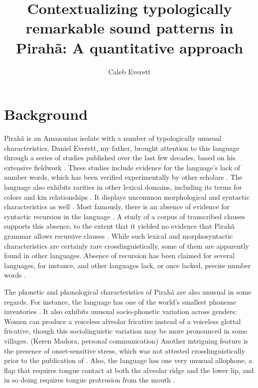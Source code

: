 \documentclass[output=paper,colorlinks,citecolor=brown
]{langscibook}
\title[Contextualizing typologically remarkable sound patterns in Pirahã]{Contextualizing typologically remarkable sound patterns in Pirahã: A quantitative approach}
\author{Caleb Everett}
\begin{document}
\label{chap-13_everett}

\maketitle

\section{Background}

Pirahã is an Amazonian isolate with a number of typologically unusual characteristics. Daniel
Everett, my father, brought attention to this language through a series of studies published over
the last few decades, based on his extensive fieldwork \citep{everett1982phonetic,
  everett1984relevance,everett1986piraha,everett2001monolingual}. These studies include evidence for
the language's lack of number words, which has been verified experimentally by other scholars
\citep{frank2008number, everett2012quantity}. The language also exhibits rarities in other lexical
domains, including its terms for colors and kin relationships \citep{everett2005cultural}. It displays uncommon morphological and syntactic characteristics as well \citep{thomason2001pronoun, everett2012language}. Most famously, there is an absence of evidence for syntactic recursion in the language \citep{everett2005cultural}. A study of a corpus of transcribed clauses supports this absence, to the extent that it yielded no evidence that Pirahã grammar allows recursive clauses \citep{futrell2016corpus}. While such lexical and morphosyntactic characteristics are certainly rare crosslinguistically, some of them are apparently found in other languages. Absence of recursion has been claimed for several languages, for instance, and other languages lack, or once lacked, precise number words \citep{pullum2020theorizing, everett2017numbers}.
    
    The phonetic and phonological characteristics of Pirahã are also unusual in some regards. For instance, the language has one of the world’s smallest phoneme inventories \citep{everett2009piraha}. It also exhibits unusual socio-phonetic variation across genders: Women can produce a voiceless alveolar fricative instead of a voiceless glottal fricative, though this sociolinguistic variation may be more pronounced in some villages. (Keren Madora, personal communication) Another intriguing feature is the presence of onset-sensitive stress, which was not attested crosslinguistically prior to the publication of . Also, the language has one very unusual allophone, a flap that requires tongue contact at both the alveolar ridge and the lower lip, and in so doing requires tongue protrusion from the mouth \citep{everett1982phonetic}.
\end{document}
